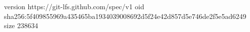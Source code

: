 version https://git-lfs.github.com/spec/v1
oid sha256:5f409855969a435465ba1934039008692d5f24e42d857d5e746de2f5e5ad6249
size 238634
